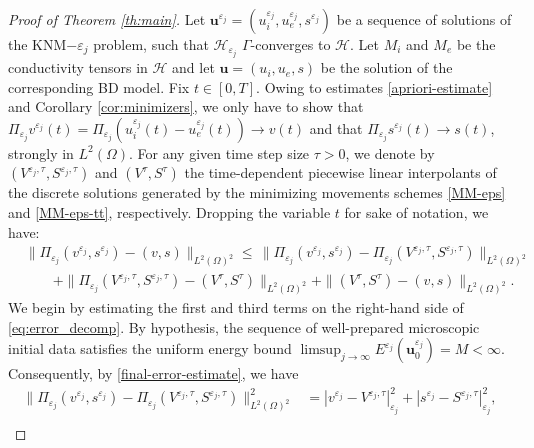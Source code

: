 \documentclass[a4paper,11pt]{article}
\theoremstyle{definition}
\numberwithin{equation}{section}
\newcommand{\e}{\varepsilon}
\begin{document}
\begin{proof}[Proof of Theorem \ref{th:main}]
Let $\mathbf{u}^{\e_j} = (u_i^{\e_j},u_e^{\e_j},s^{\e_j})$ be a sequence of  solutions of the KNM$-\e_j$ problem, such that $\mathcal H_{\e_j}$ $\Gamma$-converges to $\mathcal H$. Let $M_i$ and $M_e$ be the conductivity tensors in $\mathcal H$ and let $\mathbf{u}=(u_i,u_e,s)$ be the solution of the corresponding BD model. Fix $t \in [0, T]$. Owing to estimates \eqref{apriori-estimate} and Corollary \ref{cor:minimizers}, we only have to show that $\Pi_{\varepsilon_j} v^{\varepsilon_j}(t)=\Pi_{\varepsilon_j}\left(u_i^{\varepsilon_j}(t) - u_e^{\varepsilon_j}(t)\right) \to v(t)$ and that $\Pi_{\varepsilon_j} s^{\varepsilon_j}(t) \to s(t)$, strongly in $L^2(\Omega)$. For any given time step size $\tau > 0$, we denote by $(V^{\varepsilon_j,\tau},S^{\varepsilon_j,\tau})$ and $(V^\tau,S^\tau)$ the time-dependent piecewise linear interpolants of the discrete solutions generated by the minimizing movements schemes \eqref{MM-eps} and \eqref{MM-eps-tt}, respectively. Dropping the variable $t$ for sake of notation, we have:
\begin{equation}
	\label{eq:error_decomp}
	\begin{aligned}
		& \|\Pi_{\varepsilon_j}(v^{\varepsilon_j},s^{\varepsilon_j}) - (v,s)\|_{L^2(\Omega)^2}\leq \, \| \Pi_{\varepsilon_j}(v^{\varepsilon_j},s^{\varepsilon_j}) - \Pi_{\varepsilon_j}(V^{\varepsilon_j,\tau},S^{\varepsilon_j,\tau})\|_{L^2(\Omega)^2} \\
		&\quad \quad + \|\Pi_{\varepsilon_j}(V^{\varepsilon_j,\tau},S^{\varepsilon_j,\tau}) - (V^{\tau},S^{\tau})\|_{L^2(\Omega)^2} 
		+ \|(V^{\tau},S^{\tau}) - (v,s)\|_{L^2(\Omega)^2}.
	\end{aligned}
\end{equation}
We begin by estimating the first and third terms on the right-hand side of \eqref{eq:error_decomp}. By hypothesis, the sequence of well-prepared microscopic initial data satisfies the uniform energy bound $\limsup_{j \to \infty} E^{\varepsilon_j}(\mathbf{u}_0^{\varepsilon_j}) = M < \infty$. Consequently, by \eqref{final-error-estimate}, we have
\begin{equation}
	\label{eq:c1tau}
	\begin{aligned}
		\| \Pi_{\varepsilon_j}(v^{\varepsilon_j},s^{\varepsilon_j}) - \Pi_{\varepsilon_j}(V^{\varepsilon_j,\tau},S^{\varepsilon_j,\tau})\|_{L^2(\Omega)^2}^2  &= | v^{\varepsilon_j} -V^{\varepsilon_j,\tau}|_{\varepsilon_j}^2 +| s^{\varepsilon_j}-S^{\varepsilon_j,\tau}|_{\varepsilon_j}^2, \\

\end{aligned}
\end{equation}
\end{proof}
\end{document}
